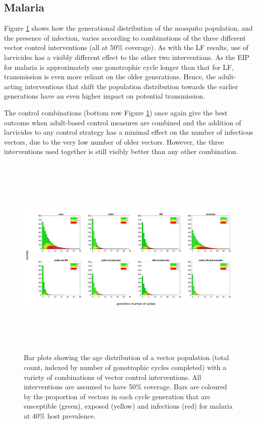 \FloatBarrier

\subsection{Malaria}

Figure \ref{fig:8controls_Ma} shows how the generational distribution of the mosquito population, and the presence of infection, varies according to combinations of the three different vector control interventions (all at 50\% coverage). As with the LF results, use of larvicides has a visibly different effect to the other two interventions. As the EIP for malaria is approximately one gonotrophic cycle longer than that for LF, transmission is even more reliant on the older generations. Hence, the adult-acting interventions that shift the population distribution towards the earlier generations have an even higher impact on potential transmission.

The control combinations (bottom row Figure \ref{fig:8controls_Ma}) once again give the best outcome when adult-based control measures are combined and the addition of larvicides to any control strategy has a minimal effect on the number of infectious vectors, due to the very low number of older vectors. However, the three interventions used together is still visibly better than any other combination.

\begin{figure} 
\includegraphics[height=10cm]{Project/Figures/VectorModel/Malaria/populationhist_8controls.png}
\caption[Age distribution with infection (malaria).]{Bar plots showing the age distribution of a vector population (total count, indexed by number of gonotrophic cycles completed) with a variety of combinations of vector control interventions. All interventions are assumed to have 50\% coverage. Bars are coloured by the proportion of vectors in each cycle generation that are susceptible (green), exposed (yellow) and infectious (red) for malaria at 40\% host prevalence.}
\label{fig:8controls_Ma}
\end{figure} 

